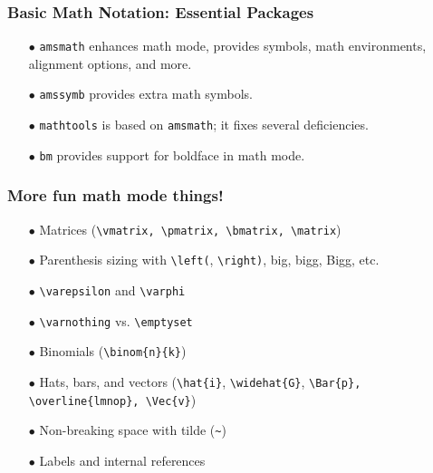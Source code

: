 \begin{frame}[fragile]
\frametitle{Basic Math Notation: Essential Packages}
\begin{itemize}
    \item[$\bullet$] \texttt{amsmath} enhances math mode, provides symbols, math environments, alignment options, and more.
    \item[$\bullet$] \texttt{amssymb} provides extra math symbols.
    \item[$\bullet$] \texttt{mathtools} is based on \texttt{amsmath}; it fixes several deficiencies.
    \item[$\bullet$] \texttt{bm} provides support for boldface in math mode.
\end{itemize}
\end{frame}


\begin{frame}[fragile]
\frametitle{More fun math mode things!}
    \begin{itemize}
        \item[$\bullet$] Matrices (\verb|\vmatrix, \pmatrix, \bmatrix, \matrix|)
        \item[$\bullet$] Parenthesis sizing with \verb|\left(|, \verb|\right)|, big, bigg, Bigg, etc.
        \item[$\bullet$] \verb|\varepsilon| and \verb|\varphi|
        \item[$\bullet$] \verb|\varnothing| vs. \verb|\emptyset|
        \item[$\bullet$] Binomials (\verb|\binom{n}{k}|)
        \item[$\bullet$] Hats, bars, and vectors 
            (\verb|\hat{i}|, \verb|\widehat{G}|, \verb|\Bar{p}, \overline{lmnop}, \Vec{v}|)
        \item[$\bullet$] Non-breaking space with tilde (\verb|~|)
        \item[$\bullet$] Labels and internal references 
    \end{itemize}
\end{frame}


